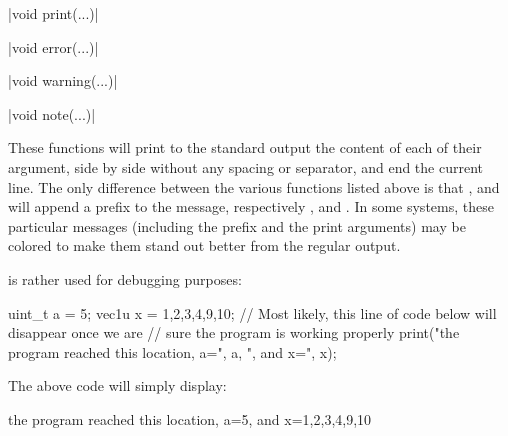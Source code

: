 \funcitem \cppinline|void print(...)| 

\cppinline|void error(...)| 

\cppinline|void warning(...)| 

\cppinline|void note(...)| 

These functions will print to the standard output the content of each of their argument, side by side without any spacing or separator, and end the current line. The only difference between the various functions listed above is that ,  and  will append a prefix to the message, respectively ,  and . In some systems, these particular messages (including the prefix and the print arguments) may be colored to make them stand out better from the regular  output.

 is rather used for debugging purposes:
\begin{cppcode}
uint_t a = 5;
vec1u x = {1,2,3,4,9,10};
// Most likely, this line of code below will disappear once we are
// sure the program is working properly
print("the program reached this location, a=", a, ", and x=", x);
\end{cppcode}

The above code will simply display:
\begin{bashcode}
the program reached this location, a=5, and x={1,2,3,4,9,10}
\end{bashcode}

